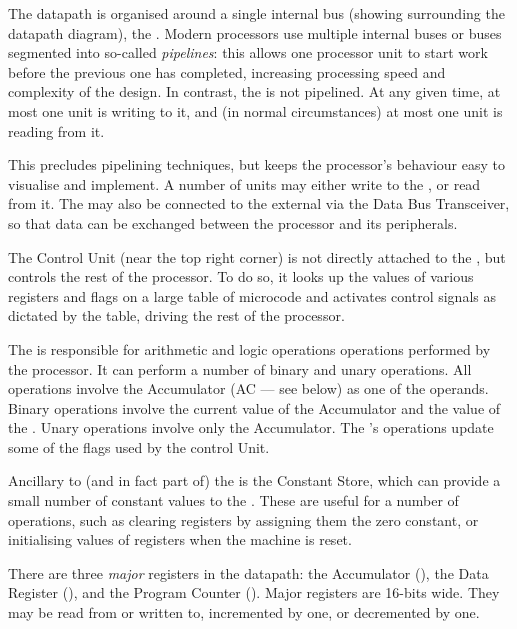 The datapath is organised around a single internal bus (showing surrounding the
datapath diagram), the \IBUS{}. Modern processors use multiple internal buses
or buses segmented into so-called {\em pipelines\/}: this allows one processor
unit to start work before the previous one has completed, increasing processing
speed and complexity of the design. In contrast, the \IBUS{} is not
pipelined. At any given time, at most one unit is writing to it, and (in normal
circumstances) at most one unit is reading from it.

This precludes pipelining techniques, but keeps the processor's behaviour easy
to visualise and implement. A number of units may either write to the \IBUS{},
or read from it. The \IBUS{} may also be connected to the external \DBUS{} via
the Data Bus Transceiver, so that data can be exchanged between the processor
and its peripherals.

The Control Unit (near the top right corner) is not directly attached to the
\IBUS{}, but controls the rest of the processor. To do so, it looks up the
values of various registers and flags on a large table of \gls{microcode} and
activates control signals as dictated by the table, driving the rest of the
processor.

The \ALU{} is responsible for arithmetic and logic operations
operations performed by the processor. It can perform a number of
binary and unary operations. All operations involve the
\gls{Accumulator} (AC — see below) as one of the operands. Binary
operations involve the current value of the \gls{Accumulator} and the
value of the \IBUS{}. Unary operations involve only the
\gls{Accumulator}. The \ALU's operations update some of the flags used
by the control Unit.

Ancillary to (and in fact part of) the \ALU{} is the Constant Store,
which can provide a small number of constant values to the
\IBUS{}. These are useful for a number of operations, such as clearing
registers by assigning them the zero constant, or initialising values
of registers when the machine is reset.

There are three {\em major\/} registers in the datapath: the
\gls{Accumulator} (\A), the Data Register (\DR), and the Program
Counter (\PC). Major registers are 16-bits wide. They may be read from
or written to, incremented by one, or decremented by one.

